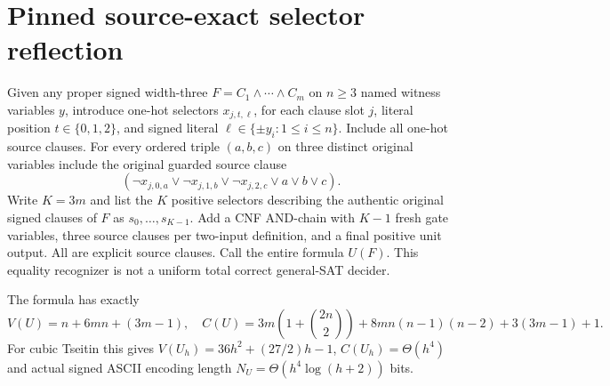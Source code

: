 \documentclass{article}
\begin{document}
\section*{Pinned source-exact selector reflection}
Given any proper signed width-three $F=C_1\land\cdots\land C_m$ on $n\ge3$ named witness variables $y$, introduce one-hot selectors $x_{j,t,\ell}$, for each clause slot $j$, literal position $t\in\{0,1,2\}$, and signed literal $\ell\in\{\pm y_i:1\le i\le n\}$. Include all one-hot source clauses. For every ordered triple $(a,b,c)$ on three distinct original variables include the original guarded source clause
\[
(\neg x_{j,0,a}\vee\neg x_{j,1,b}\vee\neg x_{j,2,c}\vee a\vee b\vee c).
\tag{1}
\]
Write $K=3m$ and list the $K$ positive selectors describing the authentic original signed clauses of $F$ as $s_0,\dots,s_{K-1}$. Add a CNF AND-chain with $K-1$ fresh gate variables, three source clauses per two-input definition, and a final positive unit output. All are explicit source clauses. Call the entire formula $U(F)$. This equality recognizer is not a uniform total correct general-SAT decider.

The formula has exactly
\[
V(U)=n+6mn+(3m-1),\quad
C(U)=3m(1+\binom{2n}{2})+8mn(n-1)(n-2)+3(3m-1)+1.
\]
For cubic Tseitin this gives $V(U_h)=36h^2+(27/2)h-1$, $C(U_h)=\Theta(h^4)$ and actual signed ASCII encoding length $N_U=\Theta(h^4\log(h+2))$ bits.
\end{document}
